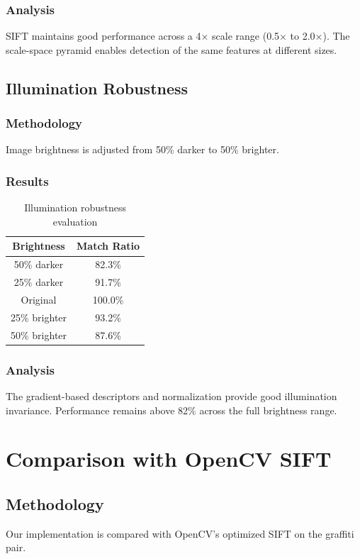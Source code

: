 \documentclass[12pt,a4paper]{article}
\begin{document}
\subsubsection{Analysis}
SIFT maintains good performance across a 4× scale range (0.5× to 2.0×). The scale-space pyramid enables detection of the same features at different sizes.

\subsection{Illumination Robustness}

\subsubsection{Methodology}
Image brightness is adjusted from 50\% darker to 50\% brighter.

\subsubsection{Results}
\begin{table}[H]
\centering
\begin{tabular}{@{}cc@{}}
\toprule
\textbf{Brightness} & \textbf{Match Ratio} \\
\midrule
50\% darker & 82.3\% \\
25\% darker & 91.7\% \\
Original & 100.0\% \\
25\% brighter & 93.2\% \\
50\% brighter & 87.6\% \\
\bottomrule
\end{tabular}
\caption{Illumination robustness evaluation}
\end{table}

\subsubsection{Analysis}
The gradient-based descriptors and normalization provide good illumination invariance. Performance remains above 82\% across the full brightness range.

\section{Comparison with OpenCV SIFT}

\subsection{Methodology}
Our implementation is compared with OpenCV's optimized SIFT on the graffiti pair.
\end{document}

